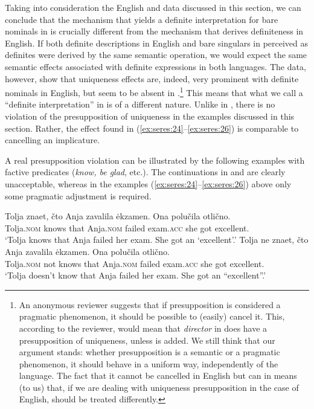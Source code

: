 \documentclass[output=paper]{langscibook}
\begin{document}
\noindent Taking into consideration the English and  data discussed in this section, we can conclude
that the mechanism that yields a definite interpretation for bare nominals in  is crucially different from the mechanism that derives definiteness in English. If both definite descriptions in English and bare singulars in  perceived as definites were derived by the same semantic operation, we would expect the same semantic effects associated with definite expressions in both languages. The data, however, show that uniqueness effects are, indeed, very prominent with definite nominals in English, but seem to be absent in .\footnote{An anonymous reviewer suggests that if presupposition is considered a pragmatic phenomenon, it should be possible to (easily) cancel it. This, according to the reviewer, would mean that \textit{director} in  does have a presupposition of uniqueness, unless  is added. We still think that our argument stands: whether presupposition is a semantic or a pragmatic phenomenon, it should behave in a uniform way, independently of the language. The fact that it cannot be cancelled in English but can in  means (to us) that, if we are dealing with uniqueness presupposition in the case of English,  should be treated differently.} This means
that what we call a ``definite interpretation'' in  is of a different nature. Unlike %
in , there is no violation of the presupposition of uniqueness in the  examples discussed in this section.
Rather, the effect found in (\ref{ex:seres:24}--\ref{ex:seres:26}) is comparable to cancelling an implicature.

A real presupposition violation can be illustrated by the following examples with factive predicates (\textit{know, be glad}, etc.). The continuations in  and  are clearly unacceptable, whereas in the examples (\ref{ex:seres:24}--\ref{ex:seres:26}) above only some pragmatic adjustment is required. %

\ea \label{ex:seres:i}
\gll Tolja		znaet,	čto		Anja		zavalila	ėkzamen.	\minsp{\#} Ona	polučila 	otlično. \\
Tolja.\textsc{nom} knows that 	Anja.\textsc{nom}	failed 		exam.\textsc{acc}  {} she 	got 		excellent.\\
\glt `Tolja knows that Anja failed her exam. She got an `excellent'.'
\ex \label{ex:seres:ii}
\gll Tolja		ne		znaet, čto 		Anja 		zavalila	ėkzamen. \minsp{\#} Ona	polučila	otlično. \\
Tolja.\textsc{nom}  not	knows that 	Anja.\textsc{nom}	failed 		exam.\textsc{acc} {} she	got 		excellent.\\
\glt `Tolja doesn't know that Anja failed her exam. She got an ``excellent''.'
\z\largerpage[2]
\end{document}
